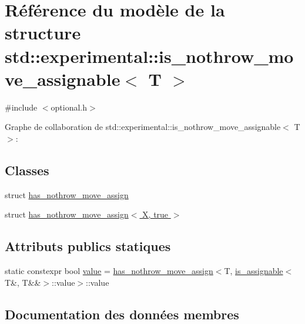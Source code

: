 \hypertarget{structstd_1_1experimental_1_1is__nothrow__move__assignable}{}\section{Référence du modèle de la structure std\+:\+:experimental\+:\+:is\+\_\+nothrow\+\_\+move\+\_\+assignable$<$ T $>$}
\label{structstd_1_1experimental_1_1is__nothrow__move__assignable}


{\ttfamily \#include $<$optional.\+h$>$}



Graphe de collaboration de std\+:\+:experimental\+:\+:is\+\_\+nothrow\+\_\+move\+\_\+assignable$<$ T $>$\+:
\subsection*{Classes}
\begin{DoxyCompactItemize}
\item 
struct \hyperlink{structstd_1_1experimental_1_1is__nothrow__move__assignable_1_1has__nothrow__move__assign}{has\+\_\+nothrow\+\_\+move\+\_\+assign}
\item 
struct \hyperlink{structstd_1_1experimental_1_1is__nothrow__move__assignable_1_1has__nothrow__move__assign_3_01_x_00_01true_01_4}{has\+\_\+nothrow\+\_\+move\+\_\+assign$<$ X, true $>$}
\end{DoxyCompactItemize}
\subsection*{Attributs publics statiques}
\begin{DoxyCompactItemize}
\item 
static constexpr bool \hyperlink{structstd_1_1experimental_1_1is__nothrow__move__assignable_a5cbdeed533da482b9f8191d79ab47270}{value} = \hyperlink{structstd_1_1experimental_1_1is__nothrow__move__assignable_1_1has__nothrow__move__assign}{has\+\_\+nothrow\+\_\+move\+\_\+assign}$<$T, \hyperlink{structstd_1_1experimental_1_1is__assignable}{is\+\_\+assignable}$<$T\&, T\&\&$>$\+::value$>$\+::value
\end{DoxyCompactItemize}


\subsection{Documentation des données membres}
\mbox{\label{structstd_1_1experimental_1_1is__nothrow__move__assignable_a5cbdeed533da482b9f8191d79ab47270}} 
